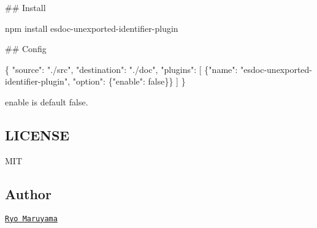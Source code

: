 \#\# Install 
\begin{DoxyCode}
npm install esdoc-unexported-identifier-plugin
\end{DoxyCode}


\#\# Config 
\begin{DoxyCode}
\{
  "source": "./src",
  "destination": "./doc",
  "plugins": [
    \{"name": "esdoc-unexported-identifier-plugin", "option": \{"enable": false\}\}
  ]
\}
\end{DoxyCode}


{\ttfamily enable} is default {\ttfamily false}.

\subsection*{L\+I\+C\+E\+N\+SE}

M\+IT

\subsection*{Author}

\href{https://github.com/h13i32maru}{\tt Ryo Maruyama} 